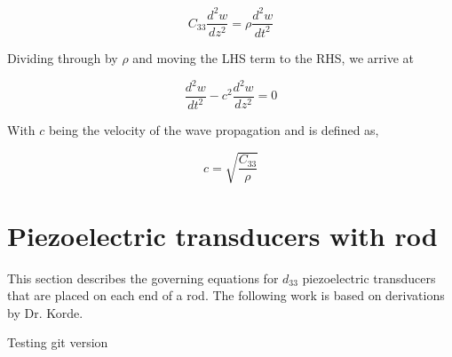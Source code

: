 \begin{equation}
C_{33}\frac{d^2w}{dz^2} = \rho \frac{d^2w}{dt^2}
\end{equation}

Dividing through by $\rho$ and moving the LHS term to the RHS, we arrive at

\begin{equation}
\frac{d^2w}{dt^2} - c^2 \frac{d^2w}{dz^2} = 0
\label{eq:waveEquationFin}
\end{equation}


With $c$ being the velocity of the wave propagation and is defined as,

\begin{equation}
c = \sqrt{\frac{C_{33}}{\rho}}
\end{equation}

\section{Piezoelectric transducers with rod}

This section describes the governing equations for $d_{33}$ piezoelectric transducers that are placed on each end of a rod. The following work is based on derivations by Dr. Korde.

Testing git version